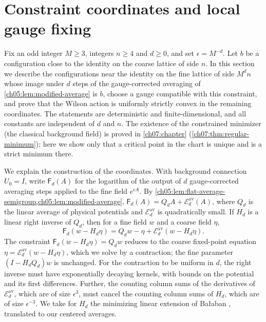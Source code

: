 \chapter{Constraint coordinates and local gauge fixing}\label{ch06:chapter}

Fix an odd integer $M\ge3$, integers $n\ge4$ and $d\ge0$, and set $\epsilon=M^{-d}$. Let $b$ be a configuration close to the identity on the coarse lattice of side $n$. In this section we describe the configurations near the identity on the fine lattice of side $M^dn$ whose image under $d$ steps of the gauge-corrected averaging of \cref{ch05:lem:modified-average} is $b$, choose a gauge compatible with this constraint, and prove that the Wilson action is uniformly strictly convex in the remaining coordinates. The statements are deterministic and finite-dimensional, and all constants are independent of $d$ and $n$. The existence of the constrained minimizer (the classical background field) is proved in \cref{ch07:chapter} (\cref{ch07:thm:regular-minimum}); here we show only that a critical point in the chart is unique and is a strict minimum there.

We explain the construction of the coordinates. With background connection $U_0=I$, write $\mathsf F_d(A)$ for the logarithm of the output of $d$ gauge-corrected averaging steps applied to the fine field $e^{\epsilon A}$. By \cref{ch05:lem:flat-average-semigroup,ch05:lem:modified-average}, $\mathsf F_d(A)=Q_dA+\mathscr E_d^{\mathrm{av}}(A)$, where $Q_d$ is the linear average of physical potentials and $\mathscr E_d^{\mathrm{av}}$ is quadratically small. If $H_d$ is a linear right inverse of $Q_d$, then for a fine field $w$ and a coarse field $\eta$,
\[
 \mathsf F_d(w-H_d\eta)=Q_dw-\eta+\mathscr E_d^{\mathrm{av}}(w-H_d\eta).
\]
The constraint $\mathsf F_d(w-H_d\eta)=Q_dw$ reduces to the coarse fixed-point equation $\eta=\mathscr E_d^{\mathrm{av}}(w-H_d\eta)$, which we solve by a contraction; the fine parameter $(I-H_dQ_d)w$ is unchanged. For the contraction to be uniform in $d$, the right inverse must have exponentially decaying kernels, with bounds on the potential and its first differences. Further, the counting column sums of the derivatives of $\mathscr E_d^{\mathrm{av}}$, which are of size $\epsilon^3$, must cancel the counting column sums of $H_d$, which are of size $\epsilon^{-3}$. We take for $H_d$ the minimizing linear extension of Bałaban \cite{Balaban1984I,Balaban1984II}, translated to our centered averages.

